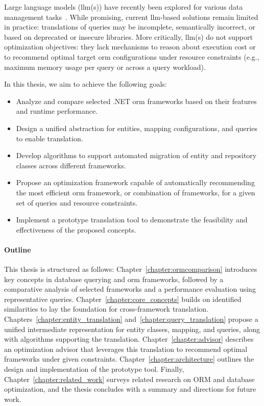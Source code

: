 Large language models (\acrshort{llm}(s)) have recently been explored for various data management tasks~\cite{DBLP:journals/pvldb/FernandezEFKT23,DBLP:journals/vldb/KatsogiannisMeimarakisK23}. While promising, current \acrshort{llm}-based solutions remain limited in practice: translations of queries may be incomplete, semantically incorrect, or based on deprecated or insecure libraries. More critically, \acrshort{llm}(s) do not support optimization objectives: they lack mechanisms to reason about execution cost or to recommend optimal target \acrshort{orm} configurations under resource constraints (e.g., maximum memory usage per query or across a query workload).

In this thesis, we aim to achieve the following goals:
\begin{itemize}
    \item Analyze and compare selected .NET \acrshort{orm} frameworks based on their features and runtime performance.
    \item Design a unified abstraction for entities, mapping configurations, and queries to enable translation.
    \item Develop algorithms to support automated migration of entity and repository classes across different frameworks.
    \item Propose an optimization framework capable of automatically recommending the most efficient \acrshort{orm} framework, or combination of frameworks, for a given set of queries and resource constraints.
    \item Implement a prototype translation tool to demonstrate the feasibility and effectiveness of the proposed concepts.
\end{itemize}

\paragraph{Outline} This thesis is structured as follows: Chapter~\ref{chapter:ormcomparison} introduces key concepts in database querying and \acrshort{orm} frameworks, followed by a comparative analysis of selected frameworks and a performance evaluation using representative queries. Chapter~\ref{chapter:core_concepts} builds on identified similarities to lay the foundation for cross-framework translation. Chapters~\ref{chapter:entity_translation} and~\ref{chapter:query_translation} propose a unified intermediate representation for entity classes, mapping, and queries, along with algorithms supporting the translation. Chapter~\ref{chapter:advisor} describes an optimization advisor that leverages this translation to recommend optimal frameworks under given constraints. Chapter~\ref{chapter:architecture} outlines the design and implementation of the prototype tool. Finally, Chapter~\ref{chapter:related_work} surveys related research on ORM and database optimization, and the thesis concludes with a summary and directions for future work.

